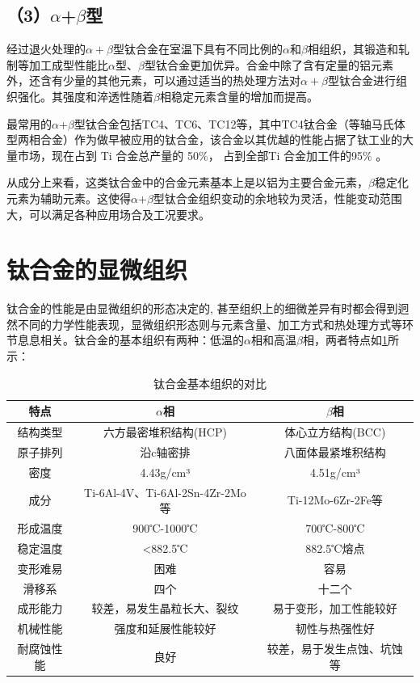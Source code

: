\subsection*{（3）$\alpha$+$\beta$型}
经过退火处理的$\alpha+\beta$型钛合金在室温下具有不同比例的$\alpha$和$\beta$相组织，其锻造和轧制等加工成型性能比$\alpha$型、$\beta$型钛合金更加优异。合金中除了含有定量的铝元素外，还含有少量的其他元素，可以通过适当的热处理方法对$\alpha+\beta$型钛合金进行组织强化。其强度和淬透性随着$\beta$相稳定元素含量的增加而提高。

最常用的$\alpha$+$\beta$型钛合金包括TC4、TC6、TC12等，其中TC4钛合金（等轴马氏体型两相合金）作为做早被应用的钛合金，该合金以其优越的性能占据了钛工业的大量市场，现在占到 Ti 合金总产量的 50$ \%  $， 占到全部Ti 合金加工件的95$ \% $ 。

从成分上来看，这类钛合金中的合金元素基本上是以铝为主要合金元素，$\beta$稳定化元素为辅助元素。这使得$\alpha$+$\beta$型钛合金组织变动的余地较为灵活，性能变动范围大，可以满足各种应用场合及工况要求\cite{TiandAl}。
\section{钛合金的显微组织}
钛合金的性能是由显微组织的形态决定的, 甚至组织上的细微差异有时都会得到迥然不同的力学性能表现，显微组织形态则与元素含量、加工方式和热处理方式等环节息息相关。钛合金的基本组织有两种：低温的$\alpha$相和高温$\beta$相，两者特点如\ref{sec:alphaandbeta}所示：

\begin{table}[htbp]
	\centering
	\caption{钛合金基本组织的对比}
	\label{sec:alphaandbeta}
	\begin{tabular}{ccc}
		\toprule
		 特点&$ \alpha $相&$ \beta $相\\ \midrule
		 结构类型 & 六方最密堆积结构(HCP) & 体心立方结构(BCC) \\
		 原子排列 & 沿c轴密排 & 八面体最紧堆积结构\\
		 密度 & 4.43g/cm³ & 4.51g/cm³ \\
		 成分 & Ti-6Al-4V、Ti-6Al-2Sn-4Zr-2Mo等 & Ti-12Mo-6Zr-2Fe等 \\
		 形成温度 & 900℃-1000℃ & 700℃-800℃ \\
 		 稳定温度 & <882.5℃ & 882.5℃熔点 \\
 		 变形难易 & 困难 & 容易 \\
 		 滑移系 & 四个 & 十二个 \\
		 成形能力 & 较差，易发生晶粒长大、裂纹 & 易于变形，加工性能较好 \\
		 机械性能 & 强度和延展性能较好 & 韧性与热强性好 \\
		 耐腐蚀性能 & 良好 & 较差，易于发生点蚀、坑蚀等 \\
		\bottomrule
	\end{tabular}
\end{table}

